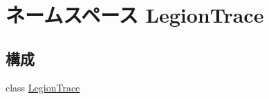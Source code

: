 \hypertarget{namespaceLegionTrace}{
\section{ネームスペース LegionTrace}
\label{namespaceLegionTrace}
}
\subsection*{構成}
\begin{DoxyCompactItemize}
\item 
class \hyperlink{classLegionTrace_1_1LegionTrace}{LegionTrace}
\end{DoxyCompactItemize}
